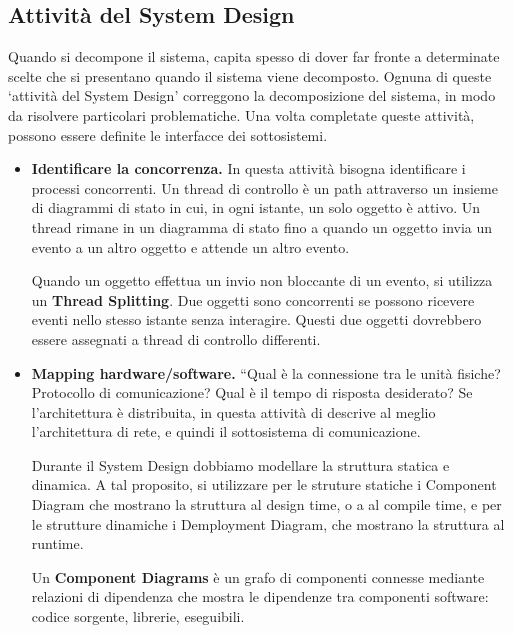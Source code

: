 \documentclass{article}
\begin{document}
        \subsection{Attività del System Design}
    
            Quando si decompone il sistema, capita spesso di dover far fronte a determinate scelte che si presentano quando il sistema viene decomposto. Ognuna di queste ‘attività del System Design’ correggono la decomposizione del sistema, in modo da risolvere particolari problematiche. Una volta completate queste attività, possono essere definite le interfacce dei sottosistemi.
            
            \begin{itemize}
                \item \textbf{Identificare la concorrenza.} In questa attività bisogna identificare i processi concorrenti. Un thread di controllo è un path attraverso un insieme di diagrammi di stato in cui, in ogni istante, un solo oggetto è attivo. Un thread rimane in un diagramma di stato fino a quando un oggetto invia un evento a un altro oggetto e attende un altro evento. 
                
                Quando un oggetto effettua un invio non bloccante di un evento, si utilizza un \textbf{Thread Splitting}. Due oggetti sono concorrenti se possono ricevere eventi nello stesso istante senza interagire. Questi due oggetti dovrebbero essere assegnati a thread di controllo differenti.
                
                \item \textbf{Mapping hardware/software.} “Qual è la connessione tra le unità fisiche? Protocollo di comunicazione? Qual è il tempo di risposta desiderato? Se l’architettura è distribuita, in questa attività di descrive al meglio l’architettura di rete, e quindi il sottosistema di comunicazione.
                
                Durante il System Design dobbiamo modellare la struttura statica e dinamica. A tal proposito, si utilizzare per le struture statiche i Component Diagram che mostrano la struttura al design time, o a al compile time, e per le strutture dinamiche i Demployment Diagram, che mostrano la struttura al runtime. 
                
                Un \textbf{Component Diagrams} è un grafo di componenti connesse mediante relazioni di dipendenza che mostra le dipendenze tra componenti software: codice sorgente, librerie, eseguibili.  
                

\end{itemize}
\end{document}
